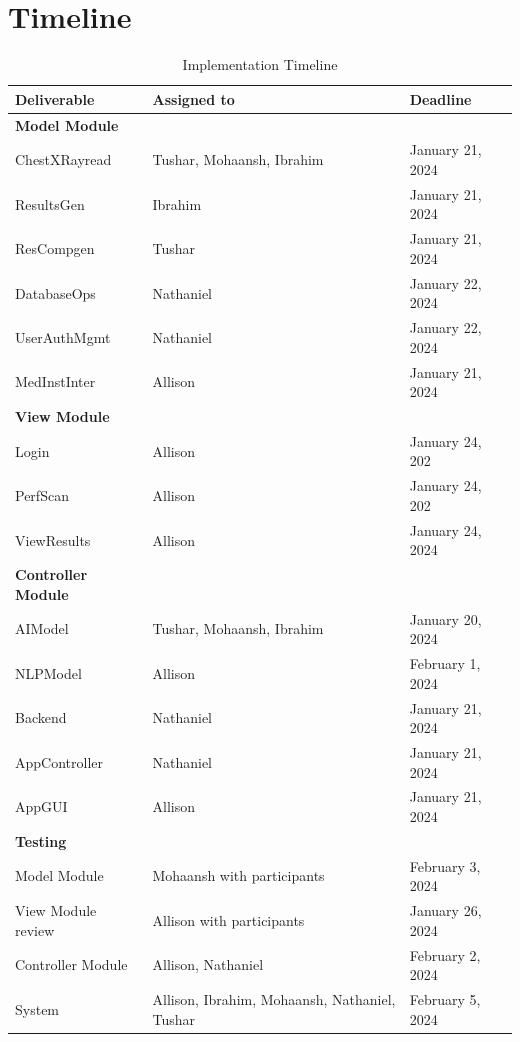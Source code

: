 \documentclass[12pt, titlepage]{article}
\begin{document}
\section{Timeline}
\begin{table}
    \begin{tabular}{l l l} 
    \toprule        
    \textbf{Deliverable} & \textbf{Assigned to} & \textbf{Deadline}\\
    \midrule 
    \textbf{Model Module} & \\
    \midrule
    ChestXRayread & Tushar, Mohaansh, Ibrahim & January 21, 2024 \\
    ResultsGen & Ibrahim & January 21, 2024\\
    ResCompgen & Tushar & January 21, 2024\\
    DatabaseOps & Nathaniel & January 22, 2024\\
    UserAuthMgmt & Nathaniel & January 22, 2024\\
    MedInstInter & Allison & January 21, 2024 \\
    \midrule
    \textbf{View Module} \\
    \midrule
    Login & Allison & January 24, 202 \\
    PerfScan & Allison & January 24, 202\\
    ViewResults & Allison & January 24, 2024 \\
    \midrule
    \textbf{Controller Module} \\
    \midrule
    AIModel & Tushar, Mohaansh, Ibrahim & January 20, 2024\\
    NLPModel & Allison & February 1, 2024\\
    Backend & Nathaniel & January 21, 2024\\
    AppController & Nathaniel & January 21, 2024\\
    AppGUI & Allison & January 21, 2024\\
    \midrule
    \textbf{Testing} \\
    \midrule
    Model Module & Mohaansh with participants & February 3, 2024 \\
    View Module review & Allison with participants & January 26, 2024 \\
    Controller Module & Allison, Nathaniel & February 2, 2024  \\
    System & Allison, Ibrahim, Mohaansh, Nathaniel, Tushar & February 5, 2024 \\
    \bottomrule
    \end{tabular}\\
    \caption{Implementation Timeline}
    \label{table:Timeline}
\end{table}
\end{document}
